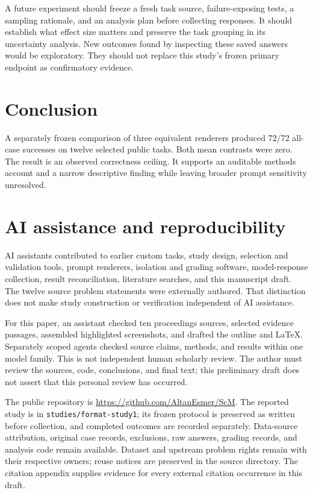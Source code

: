 \documentclass[conference,a4paper]{IEEEtran}
\begin{document}
A future experiment should freeze a fresh task source, failure-exposing tests, a sampling rationale, and an analysis plan before collecting responses. It should establish what effect size matters and preserve the task grouping in its uncertainty analysis. New outcomes found by inspecting these saved answers would be exploratory. They should not replace this study's frozen primary endpoint as confirmatory evidence.

\section{Conclusion}
A separately frozen comparison of three equivalent renderers produced 72/72 all-case successes on twelve selected public tasks. Both mean contrasts were zero. The result is an observed correctness ceiling. It supports an auditable methods account and a narrow descriptive finding while leaving broader prompt sensitivity unresolved.

\section*{AI assistance and reproducibility}
AI assistants contributed to earlier custom tasks, study design, selection and validation tools, prompt renderers, isolation and grading software, model-response collection, result reconciliation, literature searches, and this manuscript draft. The twelve source problem statements were externally authored. That distinction does not make study construction or verification independent of AI assistance.

For this paper, an assistant checked ten proceedings sources, selected evidence passages, assembled highlighted screenshots, and drafted the outline and LaTeX. Separately scoped agents checked source claims, methods, and results within one model family. This is not independent human scholarly review. The author must review the sources, code, conclusions, and final text; this preliminary draft does not assert that this personal review has occurred.

The public repository is \url{https://github.com/AltanEsmer/ScM}. The reported study is in \texttt{studies/format-study1}; its frozen protocol is preserved as written before collection, and completed outcomes are recorded separately. Data-source attribution, original case records, exclusions, raw answers, grading records, and analysis code remain available. Dataset and upstream problem rights remain with their respective owners; reuse notices are preserved in the source directory. The citation appendix supplies evidence for every external citation occurrence in this draft.
\end{document}
